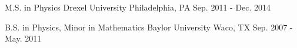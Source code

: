 

\begin{cventries}

\cventry
  {M.S. in Physics} %
  {Drexel University} %
  {Philadelphia, PA} %
  {Sep. 2011 - Dec. 2014} %
  {
    \begin{cvitems} %
    \end{cvitems}
  }  
\cventry
  {B.S. in Physics, Minor in Mathematics} %
  {Baylor University} %
  {Waco, TX} %
  {Sep. 2007 - May. 2011} %
  {
    \begin{cvitems} %
    \end{cvitems}
  }

\end{cventries}

